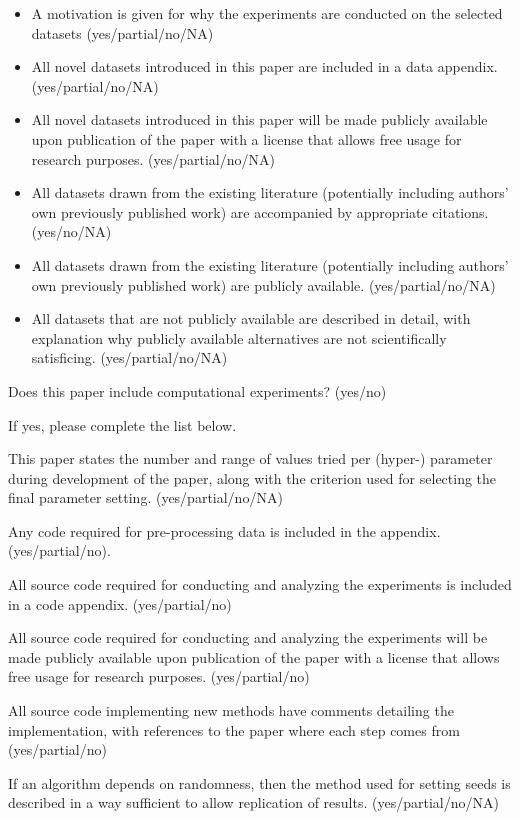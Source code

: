 \begin{itemize}
    \item A motivation is given for why the experiments are conducted on the selected datasets (yes/partial/no/NA)
   \item  All novel datasets introduced in this paper are included in a data appendix. (yes/partial/no/NA)
    \item All novel datasets introduced in this paper will be made publicly available upon publication of the paper with a license that allows free usage for research purposes. (yes/partial/no/NA)
    \item All datasets drawn from the existing literature (potentially including authors’ own previously published work) are accompanied by appropriate citations. (yes/no/NA)
    \item All datasets drawn from the existing literature (potentially including authors’ own previously published work) are publicly available. (yes/partial/no/NA)
    \item All datasets that are not publicly available are described in detail, with explanation why publicly available alternatives are not scientifically satisficing. (yes/partial/no/NA)
\end{itemize}

Does this paper include computational experiments? (yes/no)

If yes, please complete the list below.

This paper states the number and range of values tried per (hyper-) parameter during development of the paper, along with the criterion used for selecting the final parameter setting. (yes/partial/no/NA)

Any code required for pre-processing data is included in the appendix. (yes/partial/no).

All source code required for conducting and analyzing the experiments is included in a code appendix. (yes/partial/no)

All source code required for conducting and analyzing the experiments will be made publicly available upon publication of the paper with a license that allows free usage for research purposes. (yes/partial/no)

All source code implementing new methods have comments detailing the implementation, with references to the paper where each step comes from (yes/partial/no)

If an algorithm depends on randomness, then the method used for setting seeds is described in a way sufficient to allow replication of results. (yes/partial/no/NA)

